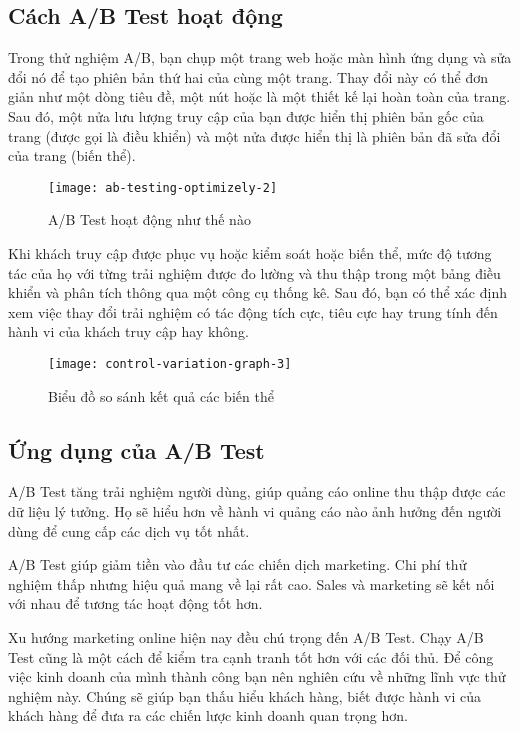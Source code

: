 \subsection{Cách A/B Test hoạt động}

Trong thử nghiệm A/B, bạn chụp một trang web hoặc màn hình ứng dụng và sửa đổi nó để tạo phiên bản thứ hai của cùng một trang. Thay đổi này có thể đơn giản như một dòng tiêu đề, một nút hoặc là một thiết kế lại hoàn toàn của trang. Sau đó, một nửa lưu lượng truy cập của bạn được hiển thị phiên bản gốc của trang (được gọi là điều khiển) và một nửa được hiển thị là phiên bản đã sửa đổi của trang (biến thể).

\begin{figure}[H]
	\centering
	\texttt{[image: ab-testing-optimizely-2]}
	\caption{A/B Test hoạt động như thế nào}
\end{figure}

Khi khách truy cập được phục vụ hoặc kiểm soát hoặc biến thể, mức độ tương tác của họ với từng trải nghiệm được đo lường và thu thập trong một bảng điều khiển và phân tích thông qua một công cụ thống kê. Sau đó, bạn có thể xác định xem việc thay đổi trải nghiệm có tác động tích cực, tiêu cực hay trung tính đến hành vi của khách truy cập hay không.

\begin{figure}[H]
	\centering
	\texttt{[image: control-variation-graph-3]}
	\caption{Biểu đồ so sánh kết quả các biến thể}
\end{figure}

\subsection{Ứng dụng của A/B Test}

A/B Test tăng trải nghiệm người dùng, giúp quảng cáo online thu thập được các dữ liệu lý tưởng. Họ sẽ hiểu hơn về hành vi quảng cáo nào ảnh hưởng đến người dùng để cung cấp các dịch vụ tốt nhất.

A/B Test giúp giảm tiền vào đầu tư các chiến dịch marketing. Chi phí thử nghiệm thấp nhưng hiệu quả mang về lại rất cao. Sales và marketing sẽ kết nối với nhau để tương tác hoạt động tốt hơn.

Xu hướng marketing online hiện nay đều chú trọng đến A/B Test. Chạy A/B Test cũng là một cách để kiểm tra cạnh tranh tốt hơn với các đối thủ. Để công việc kinh doanh của mình thành công bạn nên nghiên cứu về những lĩnh vực thử nghiệm này. Chúng sẽ giúp bạn thấu hiểu khách hàng, biết được hành vi của khách hàng để đưa ra các chiến lược kinh doanh quan trọng hơn.


